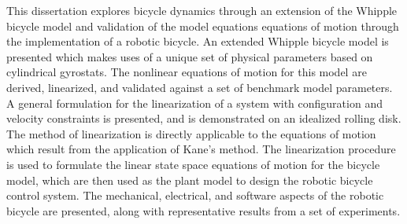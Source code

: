 This dissertation explores bicycle dynamics through an extension of the Whipple
bicycle model and validation of the model equations equations of motion through
the implementation of a robotic bicycle. An extended Whipple bicycle model is
presented which makes uses of a unique set of physical parameters based on
cylindrical gyrostats. The nonlinear equations of motion for this model are
derived, linearized, and validated against a set of benchmark model parameters.
A general formulation for the linearization of a system with configuration and
velocity constraints is presented, and is demonstrated on an idealized rolling
disk. The method of linearization is directly applicable to the equations of
motion which result from the application of Kane's method. The linearization
procedure is used to formulate the linear state space equations of motion for
the bicycle model, which are then used as the plant model to design the robotic
bicycle control system. The mechanical, electrical, and software aspects of the
robotic bicycle are presented, along with representative results from a set of
experiments.

